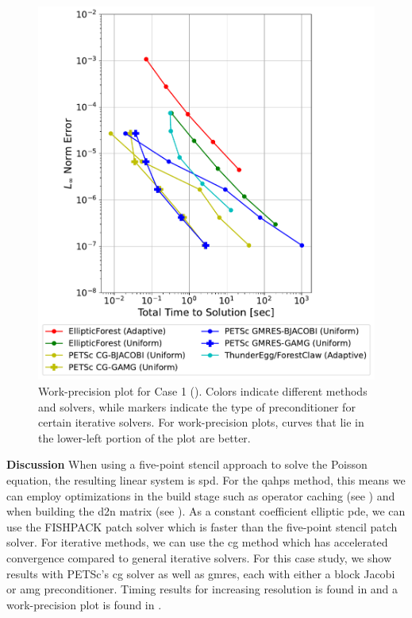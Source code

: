 \begin{figure}
    \centering
    \includegraphics[width=1.0\textwidth, clip=true, trim={0 0 0 0}]{figures/case01-work-precision-plots-no-title.pdf}
    \caption{Work-precision plot for Case 1 (). Colors indicate different methods and solvers, while markers indicate the type of preconditioner for certain iterative solvers. For work-precision plots, curves that lie in the lower-left portion of the plot are better.}
    \label{fig:case01-work-precision-plot}
\end{figure}

{\bf Discussion}
When using a five-point stencil approach to solve the Poisson equation, the resulting linear system is \gls{spd}. For the \gls{qahps} method, this means we can employ optimizations in the build stage such as operator caching (see ) and when building the \gls{d2n} matrix (see ). As a constant coefficient elliptic \gls{pde}, we can use the FISHPACK patch solver which is faster than the five-point stencil patch solver. For iterative methods, we can use the \gls{cg} method which has accelerated convergence compared to general iterative solvers. For this case study, we show results with PETSc's \gls{cg} solver as well as \gls{gmres}, each with either a block Jacobi or \gls{amg} preconditioner. Timing results for increasing resolution is found in  and a work-precision plot is found in .


